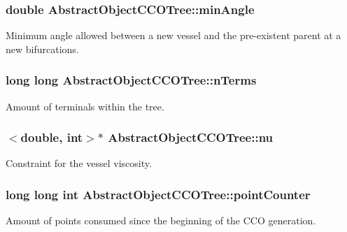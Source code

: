 \subsubsection[{\texorpdfstring{min\+Angle}{minAngle}}]{\setlength{\rightskip}{0pt plus 5cm}double Abstract\+Object\+C\+C\+O\+Tree\+::min\+Angle\hspace{0.3cm}{\ttfamily [protected]}}\hypertarget{class_abstract_object_c_c_o_tree_a254b7d92f417613be6019031a0afb63d}{}\label{class_abstract_object_c_c_o_tree_a254b7d92f417613be6019031a0afb63d}
Minimum angle allowed between a new vessel and the pre-\/existent parent at a new bifurcations. 
\subsubsection[{\texorpdfstring{n\+Terms}{nTerms}}]{\setlength{\rightskip}{0pt plus 5cm}long long Abstract\+Object\+C\+C\+O\+Tree\+::n\+Terms\hspace{0.3cm}{\ttfamily [protected]}}\hypertarget{class_abstract_object_c_c_o_tree_ad6c998c6ee999126718ca75cf7eeea0e}{}\label{class_abstract_object_c_c_o_tree_ad6c998c6ee999126718ca75cf7eeea0e}
Amount of terminals within the tree. 
\subsubsection[{\texorpdfstring{nu}{nu}}]{$<$double, int$>$$\ast$ Abstract\+Object\+C\+C\+O\+Tree\+::nu\hspace{0.3cm}{\ttfamily [protected]}}\hypertarget{class_abstract_object_c_c_o_tree_a92e6b6d1a2fac7331eee34fb28158828}{}\label{class_abstract_object_c_c_o_tree_a92e6b6d1a2fac7331eee34fb28158828}
Constraint for the vessel viscosity. 
\subsubsection[{\texorpdfstring{point\+Counter}{pointCounter}}]{\setlength{\rightskip}{0pt plus 5cm}long long int Abstract\+Object\+C\+C\+O\+Tree\+::point\+Counter\hspace{0.3cm}{\ttfamily [protected]}}\hypertarget{class_abstract_object_c_c_o_tree_a8d8512b976d31017c242e229dafebd0a}{}\label{class_abstract_object_c_c_o_tree_a8d8512b976d31017c242e229dafebd0a}
Amount of points consumed since the beginning of the C\+CO generation. 

